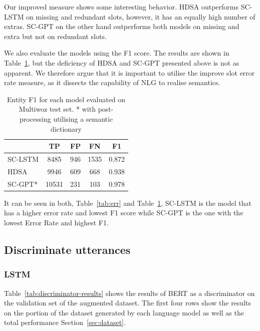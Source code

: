 \documentclass[11pt]{article}
\begin{document}
Our improved measure shows some interesting behavior. HDSA outperforms SC-LSTM on missing and redundant slots, however, it has an equally high number of extras. SC-GPT on the other hand outperforms both models on missing and extra but not on redundant slots.


We also evaluate the models using the F1 score. The results are shown in Table~\ref{tab:f1}, but the deficiency  of HDSA and SC-GPT presented above is not as apparent. We therefore argue that it is important to utilise the improve slot error rate measure, as it dissects the capability of NLG to realise semantics.


\begin{center}
\begin{table}[H]
\centering
\begin{tabular}{l|c|c|c|c}
 & TP & FP & FN & F1 \\ \hline
 SC-LSTM & 8485 & 946 & 1535 &  0.872 \\ \hline
HDSA & 9946 & 609 & 668 &  0.938 \\ \hline
SC-GPT* & 10531 & 231 & 103 & 0.978\\ \hline
\end{tabular}
\caption{Entity F1 for each model evaluated on Multiwoz test set. * with post-processing utilising a semantic dictionary}
\label{tab:f1}
\end{table}
\end{center}

It can be seen in both, Table~\ref{tab:err} and Table~\ref{tab:f1}, SC-LSTM is the model that has a higher error rate and lowest F1 score while SC-GPT is the one with the lowest Error Rate and highest F1.

\subsection{Discriminate utterances}\label{results-language-model}
\subsubsection{LSTM}
Table~\ref{tab:discriminator-results} shows the results of BERT as a discriminator on the validation set of the augmented dataset. The first four rows show the results on the portion of the dataset generated by each language model as well as the total performance Section~\ref{sec:dataset}. 
\end{document}
